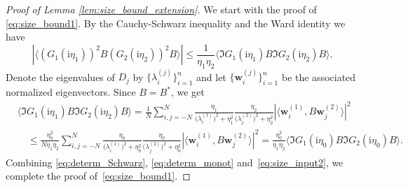 \documentclass[10pt]{amsart}
\numberwithin{equation}{section}
\newcommand{\ii}{\mathrm{i}}
\begin{document}
\begin{proof}[Proof of Lemma \ref{lem:size_bound_extension}] We start with the proof of \eqref{eq:size_bound1}. By the Cauchy-Schwarz inequality and the Ward identity we have
\begin{equation}
\left\vert\langle (G_1(\ii\eta_1))^2 B (G_2(\ii\eta_2))^2B\rangle\right\vert \le \frac{1}{\eta_1\eta_2}\langle \Im G_1(\ii\eta_1)B \Im G_2(\ii\eta_2)B\rangle.
\label{eq:determ_Schwarz}
\end{equation}
Denote the eigenvalues of $D_j$ by $\{\lambda_i^{(j)}\}_{i=1}^n$ and let $\{\bm{w}_i^{(j)}\}_{i=1}^n$ be the associated normalized eigenvectors. Since $B=B^*$, we get
\begin{equation}
\begin{split}
&\langle \Im G_1(\ii\eta_1)B \Im G_2(\ii\eta_2)B\rangle = \frac{1}{N}\sum_{i,j=-N}^N \frac{\eta_1}{\big(\lambda_i^{(1)}\big)^2+\eta_1^2}\frac{\eta_2}{\big(\lambda_j^{(2)}\big)^2+\eta_2^2}\left\vert\langle \bm{w}^{(1)}_i,B\bm{w}^{(2)}_j\rangle\right\vert^2\\
&\quad \le \frac{\eta_0^2}{N\eta_1\eta_2}\sum_{i,j=-N}^N \frac{\eta_0}{\big(\lambda_i^{(1)}\big)^2+\eta_0^2}\frac{\eta_0}{\big(\lambda_j^{(2)}\big)^2+\eta_0^2}\left\vert\langle \bm{w}^{(1)}_i,B\bm{w}^{(2)}_j\rangle\right\vert^2 = \frac{\eta_0^2}{\eta_1\eta_2} \langle \Im G_1(\ii\eta_0)B \Im G_2(\ii\eta_0)B\rangle.
\end{split}
\label{eq:determ_monot}
\end{equation}
Combining \eqref{eq:determ_Schwarz}, \eqref{eq:determ_monot} and~\eqref{eq:size_input2}, we complete the proof of~\eqref{eq:size_bound1}.


\end{proof}
\end{document}
